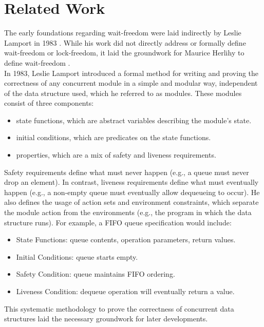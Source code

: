 \chapter{Related Work}\label{ch:related-work}

The early foundations regarding wait-freedom were laid indirectly by Leslie Lamport in 1983 \cite{Lamport1983SPSCCircularBuffer}. While his work did not directly address or formally define wait-freedom or lock-freedom, it laid the groundwork for Maurice Herlihy to define wait-freedom \cite{herlihy1991wait}. \\
In 1983, Leslie Lamport introduced a formal method for writing and proving the correctness of any concurrent module in a simple and modular way, independent of the data structure used, which he referred to as modules. These modules consist of three components: 
\begin{itemize}
   \item state functions, which are abstract variables describing the module's state.
   \item initial conditions, which are predicates on the state functions.
   \item properties, which are a mix of safety and liveness requirements.
\end{itemize}
Safety requirements define what must never happen (e.g., a queue must never drop an element). In contrast, liveness requirements define what must eventually happen (e.g., a non-empty queue must eventually allow dequeueing to occur). He also defines the usage of action sets and environment constraints, which separate the module action from the environments (e.g., the program in which the data structure runs). For example, a \ac{FIFO} queue specification would include:
\begin{itemize}
   \item State Functions: queue contents, operation parameters, return values.
   \item Initial Conditions: queue starts empty.
   \item Safety Condition: queue maintains \ac{FIFO} ordering.
   \item Liveness Condition: dequeue operation will eventually return a value.
\end{itemize}
This systematic methodology to prove the correctness of concurrent data structures laid the necessary groundwork for later developments. \cite{Lamport1983SPSCCircularBuffer}

